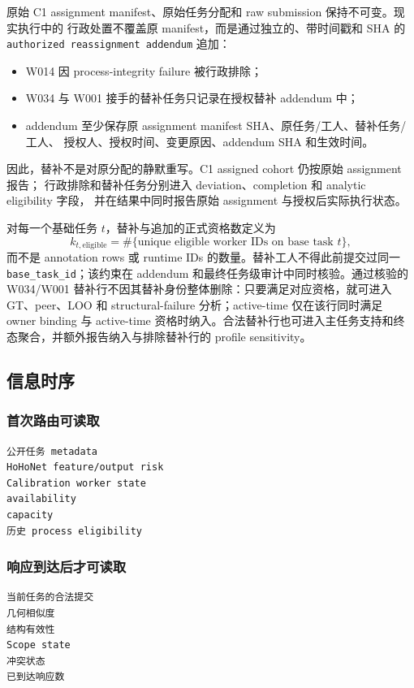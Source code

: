 原始 C1 assignment manifest、原始任务分配和 raw submission 保持不可变。现实执行中的
行政处置不覆盖原 manifest，而是通过独立的、带时间戳和 SHA 的
\texttt{authorized reassignment addendum} 追加：

\begin{itemize}
  \item W014 因 process-integrity failure 被行政排除；
  \item W034 与 W001 接手的替补任务只记录在授权替补 addendum 中；
  \item addendum 至少保存原 assignment manifest SHA、原任务/工人、替补任务/工人、
  授权人、授权时间、变更原因、addendum SHA 和生效时间。
\end{itemize}

因此，替补不是对原分配的静默重写。C1 assigned cohort 仍按原始 assignment 报告；
行政排除和替补任务分别进入 deviation、completion 和 analytic eligibility 字段，
并在结果中同时报告原始 assignment 与授权后实际执行状态。

对每一个基础任务 \(t\)，替补与追加的正式资格数定义为
\[
k_{t,\mathrm{eligible}}
=\#\{\text{unique eligible worker IDs on base task }t\},
\]
而不是 annotation rows 或 runtime IDs 的数量。替补工人不得此前提交过同一
\texttt{base\_task\_id}；该约束在 addendum 和最终任务级审计中同时核验。通过核验的
W034/W001 替补行不因其替补身份整体删除：只要满足对应资格，就可进入 GT、peer、LOO
和 structural-failure 分析；active-time 仅在该行同时满足 owner binding 与 active-time
资格时纳入。合法替补行也可进入主任务支持和终态聚合，并额外报告纳入与排除替补行的
profile sensitivity。

\subsection{信息时序}

\subsubsection{首次路由可读取}

\begin{verbatim}
公开任务 metadata
HoHoNet feature/output risk
Calibration worker state
availability
capacity
历史 process eligibility
\end{verbatim}

\subsubsection{响应到达后才可读取}

\begin{verbatim}
当前任务的合法提交
几何相似度
结构有效性
Scope state
冲突状态
已到达响应数
\end{verbatim}

